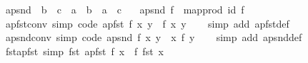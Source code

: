 \begin{isabellebody}
\isanewline
{}\isamarkupfalse%
\ apsnd\ {\isacharcolon}{\kern0pt}{\isacharcolon}{\kern0pt}\ {\isachardoublequoteopen}{\isacharparenleft}{\kern0pt}{\isacharprime}{\kern0pt}b\ {\isasymRightarrow}\ {\isacharprime}{\kern0pt}c{\isacharparenright}{\kern0pt}\ {\isasymRightarrow}\ {\isacharprime}{\kern0pt}a\ {\isasymtimes}\ {\isacharprime}{\kern0pt}b\ {\isasymRightarrow}\ {\isacharprime}{\kern0pt}a\ {\isasymtimes}\ {\isacharprime}{\kern0pt}c{\isachardoublequoteclose}\isanewline
\ \ \ {\isachardoublequoteopen}apsnd\ f\ {\isacharequal}{\kern0pt}\ map{\isacharunderscore}{\kern0pt}prod\ id\ f{\isachardoublequoteclose}\isanewline
\isanewline
{}\isamarkupfalse%
\ apfst{\isacharunderscore}{\kern0pt}conv\ {\isacharbrackleft}{\kern0pt}simp{\isacharcomma}{\kern0pt}\ code{\isacharbrackright}{\kern0pt}{\isacharcolon}{\kern0pt}\ {\isachardoublequoteopen}apfst\ f\ {\isacharparenleft}{\kern0pt}x{\isacharcomma}{\kern0pt}\ y{\isacharparenright}{\kern0pt}\ {\isacharequal}{\kern0pt}\ {\isacharparenleft}{\kern0pt}f\ x{\isacharcomma}{\kern0pt}\ y{\isacharparenright}{\kern0pt}{\isachardoublequoteclose}\isanewline
%
\isadelimproof
\ \ %
\endisadelimproof
%
\isatagproof
{}\isamarkupfalse%
\ {\isacharparenleft}{\kern0pt}simp\ add{\isacharcolon}{\kern0pt}\ apfst{\isacharunderscore}{\kern0pt}def{\isacharparenright}{\kern0pt}%
\endisatagproof
{\isafoldproof}%
%
\isadelimproof
\isanewline
%
\endisadelimproof
\isanewline
{}\isamarkupfalse%
\ apsnd{\isacharunderscore}{\kern0pt}conv\ {\isacharbrackleft}{\kern0pt}simp{\isacharcomma}{\kern0pt}\ code{\isacharbrackright}{\kern0pt}{\isacharcolon}{\kern0pt}\ {\isachardoublequoteopen}apsnd\ f\ {\isacharparenleft}{\kern0pt}x{\isacharcomma}{\kern0pt}\ y{\isacharparenright}{\kern0pt}\ {\isacharequal}{\kern0pt}\ {\isacharparenleft}{\kern0pt}x{\isacharcomma}{\kern0pt}\ f\ y{\isacharparenright}{\kern0pt}{\isachardoublequoteclose}\isanewline
%
\isadelimproof
\ \ %
\endisadelimproof
%
\isatagproof
{}\isamarkupfalse%
\ {\isacharparenleft}{\kern0pt}simp\ add{\isacharcolon}{\kern0pt}\ apsnd{\isacharunderscore}{\kern0pt}def{\isacharparenright}{\kern0pt}%
\endisatagproof
{\isafoldproof}%
%
\isadelimproof
\isanewline
%
\endisadelimproof
\isanewline
{}\isamarkupfalse%
\ fst{\isacharunderscore}{\kern0pt}apfst\ {\isacharbrackleft}{\kern0pt}simp{\isacharbrackright}{\kern0pt}{\isacharcolon}{\kern0pt}\ {\isachardoublequoteopen}fst\ {\isacharparenleft}{\kern0pt}apfst\ f\ x{\isacharparenright}{\kern0pt}\ {\isacharequal}{\kern0pt}\ f\ {\isacharparenleft}{\kern0pt}fst\ x{\isacharparenright}{\kern0pt}{\isachardoublequoteclose}\isanewline

\end{isabellebody}
